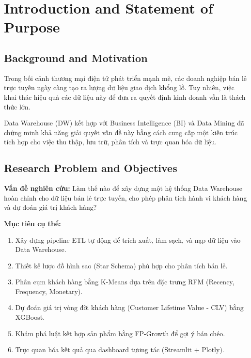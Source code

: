 \documentclass[a4paper,12pt]{article}
\begin{document}
\tableofcontents
\newpage

\section{Introduction and Statement of Purpose}

\subsection{Background and Motivation}
Trong bối cảnh thương mại điện tử phát triển mạnh mẽ, các doanh nghiệp bán lẻ trực tuyến ngày càng tạo ra lượng dữ liệu giao dịch khổng lồ. Tuy nhiên, việc khai thác hiệu quả các dữ liệu này để đưa ra quyết định kinh doanh vẫn là thách thức lớn.

Data Warehouse (DW) kết hợp với Business Intelligence (BI) và Data Mining đã chứng minh khả năng giải quyết vấn đề này bằng cách cung cấp một kiến trúc tích hợp cho việc thu thập, lưu trữ, phân tích và trực quan hóa dữ liệu.

\subsection{Research Problem and Objectives}
\textbf{Vấn đề nghiên cứu:} Làm thế nào để xây dựng một hệ thống Data Warehouse hoàn chỉnh cho dữ liệu bán lẻ trực tuyến, cho phép phân tích hành vi khách hàng và dự đoán giá trị khách hàng?

\textbf{Mục tiêu cụ thể:}
\begin{enumerate}
    \item Xây dựng pipeline ETL tự động để trích xuất, làm sạch, và nạp dữ liệu vào Data Warehouse.
    \item Thiết kế lược đồ hình sao (Star Schema) phù hợp cho phân tích bán lẻ.
    \item Phân cụm khách hàng bằng K-Means dựa trên đặc trưng RFM (Recency, Frequency, Monetary).
    \item Dự đoán giá trị vòng đời khách hàng (Customer Lifetime Value - CLV) bằng XGBoost.
    \item Khám phá luật kết hợp sản phẩm bằng FP-Growth để gợi ý bán chéo.
    \item Trực quan hóa kết quả qua dashboard tương tác (Streamlit + Plotly).
\end{enumerate}
\end{document}
